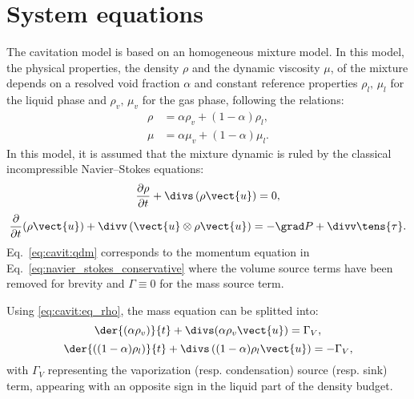 \section{System equations}

\hypertarget{cavitation}{}

\label{sec:cavit:system_equations}
The cavitation model is based on an homogeneous mixture model. In this
model, the physical properties, the density $\rho$ and the dynamic
viscosity $\mu$, of the mixture depends on a resolved void fraction
$\alpha$ and constant reference properties $\rho_l, \, \mu_l$ for the
liquid phase and $\rho_v, \, \mu_v$ for the gas phase, following the
relations:
\begin{align}
\label{eq:cavit:eq_rho}\rho&= \alpha\rho_v+(1-\alpha)\rho_l, \\
\label{eq:cavit:eq_mu}\mu&= \alpha\mu_v+(1-\alpha)\mu_l.
\end{align}
In this model, it is assumed that the mixture dynamic is ruled by the
classical incompressible Navier--Stokes equations:
\begin{equation}
\label{eq:cavit:mass}
\frac{\partial\rho}{\partial t}+\divs \left(\rho\vect{u} \right) = 0,
\end{equation}
\begin{equation}
\label{eq:cavit:qdm}
\dfrac{\partial }{\partial t}(\rho \vect{u})
+\divv \left( \vect{u}\otimes \rho \vect{u} \right)
= - \grad P + \divv  \tens{\tau}.
\end{equation}
Eq.~\eqref{eq:cavit:qdm} corresponds to the momentum equation in
Eq.~\eqref{eq:navier_stokes_conservative} where the volume source
terms have been removed for brevity and $\Gamma\equiv0$ for the mass
source term.

Using \eqref{eq:cavit:eq_rho}, the mass equation can be splitted into:
\begin{equation}
\label{eq:cavit:eq_vf0}
\der{(\alpha\rho_v)}{t}+\divs(\alpha\rho_v\vect{u}) = \Gamma_V,
\end{equation}
\begin{equation}
\label{eq:cavit:eq_lf0}
\der{\left((1-\alpha)\rho_l\right)}{t}+\divs\left((1-\alpha)\rho_l\vect{u}\right) = -\Gamma_V ,
\end{equation}
with $\Gamma_V$ representing the vaporization (resp. condensation) source (resp. sink)
term, appearing with an opposite sign in the liquid part of the
density budget.

